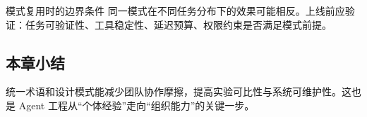 \begin{warningbox}{模式复用时的边界条件}
同一模式在不同任务分布下的效果可能相反。上线前应验证：任务可验证性、工具稳定性、延迟预算、权限约束是否满足模式前提。
\end{warningbox}

\subsection{本章小结}
统一术语和设计模式能减少团队协作摩擦，提高实验可比性与系统可维护性。这也是 Agent 工程从“个体经验”走向“组织能力”的关键一步。

